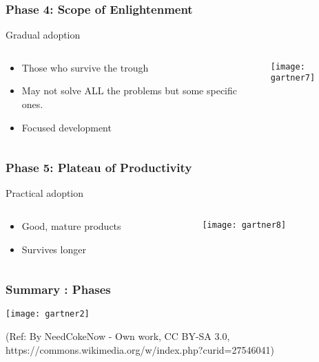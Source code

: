 \begin{frame}[fragile]\frametitle{Phase 4: Scope of Enlightenment}

Gradual adoption

 \begin{columns}
  \begin{column}{0.55\linewidth}
\begin{itemize}
\item Those who survive the trough
\item May not solve ALL the problems but some specific ones.
\item Focused development
\end{itemize}
  \end{column}%
  \begin{column}{0.45\linewidth}
			\begin{center}
			\texttt{[image: gartner7]}
			\end{center}
  \end{column}
 \end{columns}
 
\end{frame}


\begin{frame}[fragile]\frametitle{Phase 5: Plateau of Productivity}

Practical adoption


 \begin{columns}
  \begin{column}{0.55\linewidth}
\begin{itemize}
\item Good, mature products
\item Survives longer
\end{itemize}
  \end{column}%
  \begin{column}{0.45\linewidth}
			\begin{center}
			\texttt{[image: gartner8]}
			\end{center}
  \end{column}
 \end{columns}
 
\end{frame}


\begin{frame}[fragile]\frametitle{Summary : Phases}

\begin{center}
\texttt{[image: gartner2]}
\end{center}

{\tiny (Ref: By NeedCokeNow - Own work, CC BY-SA 3.0, https://commons.wikimedia.org/w/index.php?curid=27546041)}
\end{frame}

